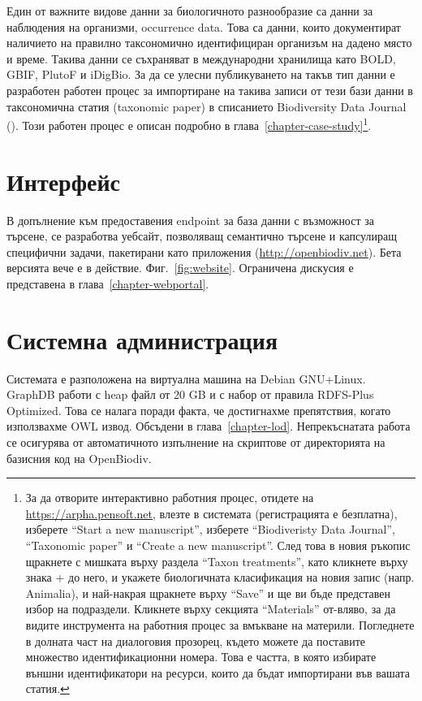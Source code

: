Един от важните видове данни за биологичното разнообразие са данни за наблюдения на организми, occurrence data. Това са данни, които документират наличието на правилно таксономично идентифициран организъм на дадено място и време. Такива данни се съхраняват в международни хранилища като BOLD, GBIF, PlutoF и iDigBio. За да се улесни публикуването на такъв тип данни е разработен работен процес за импортиране на такива записи от тези бази данни в таксономична статия (taxonomic paper) в списанието Biodiversity Data Journal (\cite{senderov_online_2016}). Този работен процес е описан подробно в глава~\ref{chapter-case-study}\footnote{За да отворите интерактивно работния процес, отидете на \url{https://arpha.pensoft.net}, влезте в системата (регистрацията е безплатна), изберете ``Start a new manuscript'', изберете ``Biodiveristy Data Journal'', ``Taxonomic paper''  и ``Create a new manuscript''. След това в новия ръкопис щракнете с мишката върху раздела ``Taxon treatments'', като кликнете върху знака $+$ до него, и укажете биологичната класификация на новия запис (напр. Animalia), и най-накрая щракнете върху ``Save'' и ще ви бъде представен избор на подраздели. Кликнете върху секцията ``Materials'' от-вляво, за да видите инструмента на работния процес за вмъкване на материли. Погледнете в долната част на диалоговия прозорец, където можете да поставите множество идентификационни номера. Това е частта, в която избирате външни идентификатори на ресурси, които да бъдат импортирани във вашата статия.}.

\section{Интерфейс}

В допълнение към предоставения endpoint за база данни с възможност за търсене, се разработва уебсайт, позволяващ семантично търсене и капсулиращ специфични задачи, пакетирани като приложения (\url{http://openbiodiv.net}). Бета версията вече е в действие. Фиг.~\ref{fig:website}. Ограничена дискусия е представена в глава~\ref{chapter-webportal}.

\section{Системна администрация}

Системата е разположена на виртуална машина на Debian GNU+Linux. GraphDB работи с heap файл от 20 GB и с набор от правила RDFS-Plus Optimized. Това се налага поради факта, че достигнахме препятствия, когато използвахме OWL извод. Обсъдени в глава~\ref {chapter-lod}. Непрекъснатата работа се осигурява от автоматичното изпълнение на скриптове от директорията  на базисния код на OpenBiodiv.

